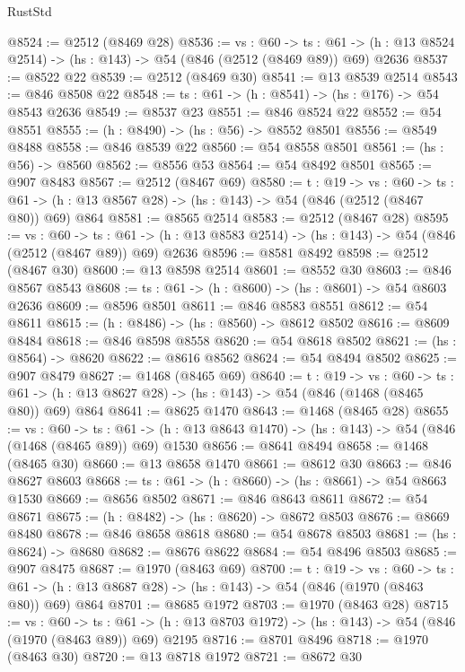 \begin{lexlean}{RustStd}
\begin{coremodule}
@8524 := @2512 (@8469 @28)
@8536 := {vs : @60} ->
  {ts : @61} -> (h : @13 @8524 @2514) -> (hs : @143) -> @54 (@846 (@2512 (@8469 @89)) @69) @2636
@8537 := @8522 @22
@8539 := @2512 (@8469 @30)
@8541 := @13 @8539 @2514
@8543 := @846 @8508 @22
@8548 := {ts : @61} -> (h : @8541) -> (hs : @176) -> @54 @8543 @2636
@8549 := @8537 @23
@8551 := @846 @8524 @22
@8552 := @54 @8551
@8555 := (h : @8490) -> (hs : @56) -> @8552 @8501
@8556 := @8549 @8488
@8558 := @846 @8539 @22
@8560 := @54 @8558 @8501
@8561 := (hs : @56) -> @8560
@8562 := @8556 @53
@8564 := @54 @8492 @8501
@8565 := @907 @8483
@8567 := @2512 (@8467 @69)
@8580 := {t : @19} ->
  {vs : @60} ->
  {ts : @61} -> (h : @13 @8567 @28) -> (hs : @143) -> @54 (@846 (@2512 (@8467 @80)) @69) @864
@8581 := @8565 @2514
@8583 := @2512 (@8467 @28)
@8595 := {vs : @60} ->
  {ts : @61} -> (h : @13 @8583 @2514) -> (hs : @143) -> @54 (@846 (@2512 (@8467 @89)) @69) @2636
@8596 := @8581 @8492
@8598 := @2512 (@8467 @30)
@8600 := @13 @8598 @2514
@8601 := @8552 @30
@8603 := @846 @8567 @8543
@8608 := {ts : @61} -> (h : @8600) -> (hs : @8601) -> @54 @8603 @2636
@8609 := @8596 @8501
@8611 := @846 @8583 @8551
@8612 := @54 @8611
@8615 := (h : @8486) -> (hs : @8560) -> @8612 @8502
@8616 := @8609 @8484
@8618 := @846 @8598 @8558
@8620 := @54 @8618 @8502
@8621 := (hs : @8564) -> @8620
@8622 := @8616 @8562
@8624 := @54 @8494 @8502
@8625 := @907 @8479
@8627 := @1468 (@8465 @69)
@8640 := {t : @19} ->
  {vs : @60} ->
  {ts : @61} -> (h : @13 @8627 @28) -> (hs : @143) -> @54 (@846 (@1468 (@8465 @80)) @69) @864
@8641 := @8625 @1470
@8643 := @1468 (@8465 @28)
@8655 := {vs : @60} ->
  {ts : @61} -> (h : @13 @8643 @1470) -> (hs : @143) -> @54 (@846 (@1468 (@8465 @89)) @69) @1530
@8656 := @8641 @8494
@8658 := @1468 (@8465 @30)
@8660 := @13 @8658 @1470
@8661 := @8612 @30
@8663 := @846 @8627 @8603
@8668 := {ts : @61} -> (h : @8660) -> (hs : @8661) -> @54 @8663 @1530
@8669 := @8656 @8502
@8671 := @846 @8643 @8611
@8672 := @54 @8671
@8675 := (h : @8482) -> (hs : @8620) -> @8672 @8503
@8676 := @8669 @8480
@8678 := @846 @8658 @8618
@8680 := @54 @8678 @8503
@8681 := (hs : @8624) -> @8680
@8682 := @8676 @8622
@8684 := @54 @8496 @8503
@8685 := @907 @8475
@8687 := @1970 (@8463 @69)
@8700 := {t : @19} ->
  {vs : @60} ->
  {ts : @61} -> (h : @13 @8687 @28) -> (hs : @143) -> @54 (@846 (@1970 (@8463 @80)) @69) @864
@8701 := @8685 @1972
@8703 := @1970 (@8463 @28)
@8715 := {vs : @60} ->
  {ts : @61} -> (h : @13 @8703 @1972) -> (hs : @143) -> @54 (@846 (@1970 (@8463 @89)) @69) @2195
@8716 := @8701 @8496
@8718 := @1970 (@8463 @30)
@8720 := @13 @8718 @1972
@8721 := @8672 @30

\end{coremodule}
\end{lexlean}
